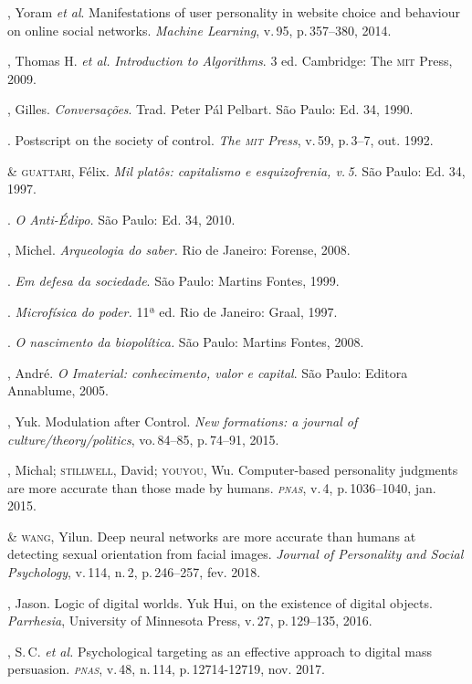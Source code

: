 \begin{bibliohedra}
, Yoram \textit{et al}. Manifestations of user personality in website
choice and behaviour on online social networks. \textit{Machine Learning}, v.\,95, p.\,357--380, 2014.

, Thomas H. \textit{et al.}
\textit{Introduction to Algorithms}. 3 ed. Cambridge: The \textsc{mit} Press, 2009.

, Gilles. \textit{Conversações}. Trad. Peter Pál Pelbart. São Paulo: Ed. 34, 1990.

\titidem. Postscript on the society of control. \textit{The \textsc{mit} Press},
v.\,59, p.\,3--7, out. 1992.

\titidem\mbox{} \& \textsc{guattari}, Félix. \textit{Mil platôs: capitalismo e
esquizofrenia, v.\,5}. São Paulo: Ed. 34, 1997.

\titidem. \textit{O Anti-Édipo.} São Paulo: Ed. 34, 2010.

, Michel. \textit{Arqueologia do saber.} Rio de Janeiro:
Forense, 2008.

\titidem. \textit{Em defesa da sociedade}. São Paulo: Martins Fontes, 1999.

\titidem. \textit{Microfísica do poder.} 11ª ed. Rio de Janeiro: Graal, 1997.

\titidem. \textit{O nascimento da biopolítica.} São Paulo: Martins Fontes, 2008.

, André. \textit{O Imaterial: conhecimento, valor e capital}. São
Paulo: Editora Annablume, 2005.

, Yuk. Modulation after Control. \textit{New formations: a journal of
culture/theory/politics}, vo.\,84--85, p.\,74--91, 2015.

, Michal; \textsc{stillwell}, David; \textsc{youyou}, Wu. Computer-based
personality judgments are more accurate than those made by
humans. \textit{\textsc{pnas}}, v.\,4, p.\,1036--1040, jan. 2015.

\titidem\mbox{} \& \textsc{wang}, Yilun. Deep neural networks are more
accurate than humans at detecting sexual orientation from facial
images. \textit{Journal of Personality and Social Psychology}, v.\,114, n.\,2, p.\,246--257, fev. 2018.

, Jason. Logic of digital worlds. Yuk Hui, on the
existence of digital objects. \textit{Parrhesia}, University of Minnesota Press, v.\,27, p.\,129--135, 2016.

, S.\,C. \textit{et al.} Psychological targeting as an effective approach to digital mass persuasion. \textit{\textsc{pnas}}, v.\,48, n.\,114, p.\,12714-12719, nov. 2017.



\end{bibliohedra}
